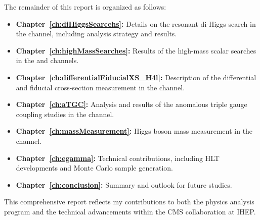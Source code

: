 The remainder of this report is organized as follows:
\begin{itemize}
    \item \textbf{Chapter~\ref{ch:diHiggsSearcehs}:} Details on the resonant di-Higgs search in the \HHWW channel, including analysis strategy and results.
    \item \textbf{Chapter~\ref{ch:highMassSearches}:} Results of the high-mass scalar searches in the \XZZ and \XZZv channels.
    \item \textbf{Chapter~\ref{ch:differentialFiducialXS_H4l}:} Description of the differential and fiducial cross-section measurement in the \HToFourL
    channel.
    \item \textbf{Chapter~\ref{ch:aTGC}:} Analysis and results of the anomalous triple gauge coupling studies in the \WpWm channel.
    \item \textbf{Chapter~\ref{ch:massMeasurement}:} Higgs boson mass measurement in the \HGG channel.
    \item \textbf{Chapter~\ref{ch:egamma}:} Technical contributions, including HLT developments and Monte Carlo sample generation.
    \item \textbf{Chapter~\ref{ch:conclusion}:} Summary and outlook for future studies.
\end{itemize}

This comprehensive report reflects my contributions to both the physics analysis program and
the technical advancements within the CMS collaboration at IHEP.
